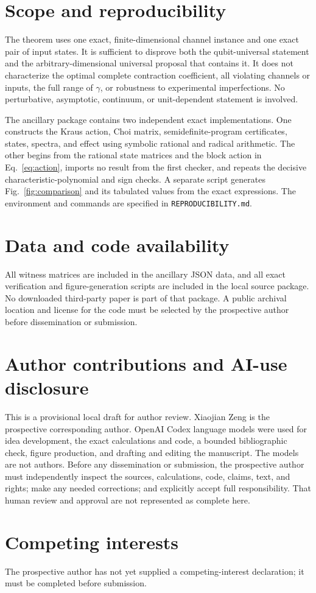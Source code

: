 \documentclass[11pt]{article}
\begin{document}
\section{Scope and reproducibility}

The theorem uses one exact, finite-dimensional channel instance and one exact
pair of input states.  It is sufficient to disprove both the qubit-universal
statement and the arbitrary-dimensional universal proposal that contains it.
It does not characterize the optimal complete contraction coefficient, all
violating channels or inputs, the full range of $\gamma$, or robustness to
experimental imperfections.  No perturbative, asymptotic, continuum, or
unit-dependent statement is involved.

The ancillary package contains two independent exact implementations.  One
constructs the Kraus action, Choi matrix, semidefinite-program certificates,
states, spectra, and effect using symbolic rational and radical arithmetic.
The other begins from the rational state matrices and the block action in
Eq.~\eqref{eq:action}, imports no result from the first checker, and repeats
the decisive characteristic-polynomial and sign checks.  A separate script
generates Fig.~\ref{fig:comparison} and its tabulated values from the exact
expressions.  The environment and commands are specified in
\texttt{REPRODUCIBILITY.md}.

\section*{Data and code availability}

All witness matrices are included in the ancillary JSON data, and all exact
verification and figure-generation scripts are included in the local source
package.  No downloaded third-party paper is part of that package.  A public
archival location and license for the code must be selected by the prospective
author before dissemination or submission.

\section*{Author contributions and AI-use disclosure}

This is a provisional local draft for author review.  Xiaojian Zeng is the
prospective corresponding author.  OpenAI Codex language models were used for
idea development, the exact calculations and code, a bounded bibliographic
check, figure production, and drafting and editing the manuscript.  The models
are not authors.  Before any dissemination or submission, the prospective
author must independently inspect the sources, calculations, code, claims,
text, and rights; make any needed corrections; and explicitly accept full
responsibility.  That human review and approval are not represented as
complete here.

\section*{Competing interests}

The prospective author has not yet supplied a competing-interest declaration;
it must be completed before submission.



\end{document}
